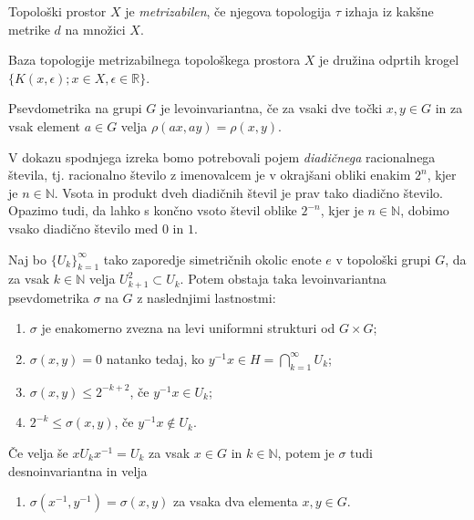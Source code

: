 \documentclass[mat1]{fmfdelo}
\newcommand{\R}{\mathbb R}
\newcommand{\N}{\mathbb N}
\begin{document}
\begin{definicija}\label{def:metrizabilnost}
	Topološki prostor $X$ je \emph{metrizabilen}, če njegova topologija $\tau$ izhaja iz kakšne metrike $d$ na množici $X$.
\end{definicija}

\begin{opomba}
	Baza topologije metrizabilnega topološkega prostora $X$ je družina odprtih krogel $\lbrace K(x, \epsilon); x \in X, \epsilon \in \R \rbrace$.
\end{opomba}


\begin{definicija}
Psevdometrika na grupi $G$ je levoinvariantna, če za vsaki dve točki $x, y \in G$ in za vsak element $a \in G$ velja $\rho(ax, ay) = \rho(x, y)$.
\end{definicija}

\begin{opomba}
V dokazu spodnjega izreka bomo potrebovali pojem \emph{diadičnega} racionalnega števila, tj. racionalno število z imenovalcem je v okrajšani obliki enakim $2^n$, kjer je $n \in \N$. Vsota in produkt dveh diadičnih števil je prav tako diadično število. Opazimo tudi, da lahko s končno vsoto števil oblike $2^{-n}$, kjer je $n \in \N$, dobimo vsako diadično število med $0$ in $1$.
\end{opomba}

\begin{izrek}\label{izr:pseudometrika}
	Naj bo $\lbrace U_k \rbrace_{k = 1}^{\infty}$ tako zaporedje simetričnih okolic enote $e$ v topološki grupi $G$, da za vsak $k \in \N$ velja $U_{k+1}^2 \subset U_k$. Potem obstaja taka levoinvariantna psevdometrika $\sigma$ na $G$ z naslednjimi lastnostmi:
	\begin{enumerate}
		\item $\sigma$ je enakomerno zvezna na levi uniformni strukturi od $G \times G$;\label{last:psevdo1}
		\item $\sigma (x, y) = 0$ natanko tedaj, ko $y^{-1}x \in H = \bigcap_{k=1}^{\infty} U_k$;\label{last:psevdo2}
		\item $\sigma (x, y) \leq 2^{-k+2}$, če $y^{-1}x \in U_k$;\label{last:psevdo3}
		\item $2^{-k} \leq \sigma (x, y)$, če $y^{-1}x \notin U_k$.\label{last:psevdo4}
	\end{enumerate}
	
	Če velja še $x U_k x^{-1} = U_k$ za vsak $x \in G$ in $k \in \N$, potem je $\sigma$ tudi desnoinvariantna in velja
	\begin{enumerate}[resume]
		\item $\sigma (x^{-1}, y^{-1}) = \sigma (x, y)$ za vsaka dva elementa $x, y \in G$.\label{last:psevdo5}
	\end{enumerate}
\end{izrek}
\end{document}

